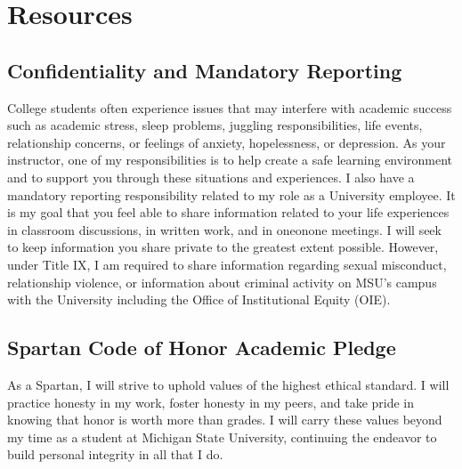 \documentclass[letterpaper,10pt,english]{jupyterBook}
\begin{document}
\sphinxstepscope


\section{Resources}
\label{\detokenize{content/0_course/7_resources:resources}}\label{\detokenize{content/0_course/7_resources::doc}}

\subsection{Confidentiality and Mandatory Reporting}
\label{\detokenize{content/0_course/7_resources:confidentiality-and-mandatory-reporting}}
\sphinxAtStartPar
College students often experience issues that may interfere with academic success such as academic stress, sleep problems, juggling responsibilities, life events, relationship concerns, or feelings of anxiety, hopelessness, or depression.
As your instructor, one of my responsibilities is to help create a safe learning environment and to support you through these situations and experiences.
I also have a mandatory reporting responsibility related to my role as a University employee.
It is my goal that you feel able to share information related to your life experiences in classroom
discussions, in written work, and in one\sphinxhyphen{}on\sphinxhyphen{}one meetings.
I will seek to keep information you share private to the greatest extent possible.
However, under Title IX, I am required to share information regarding sexual misconduct, relationship violence, or information
about criminal activity on MSU’s campus with the University including the Office of Institutional Equity (OIE).

\sphinxAtStartPar
{}


\subsection{Spartan Code of Honor Academic Pledge}
\label{\detokenize{content/0_course/7_resources:spartan-code-of-honor-academic-pledge}}
\sphinxAtStartPar
As a Spartan, I will strive to uphold values of the highest ethical standard. I will practice honesty in my work, foster honesty in my peers, and take pride in knowing that honor is worth more than grades. I will carry these values beyond my time as a student at Michigan State University, continuing the endeavor to build personal integrity in all that I do.
\end{document}
